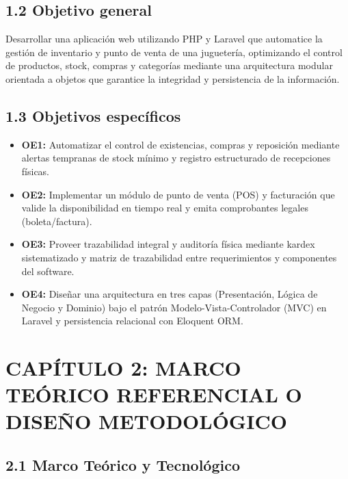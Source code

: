 \documentclass[12pt,a4paper]{article}
\begin{document}
\subsection{1.2 Objetivo general}

Desarrollar una aplicaci\'on web utilizando PHP y Laravel que automatice la
gesti\'on de inventario y punto de venta de una jugueter\'ia, optimizando el control de productos,
stock, compras y categor\'ias mediante una arquitectura modular orientada a objetos que
garantice la integridad y persistencia de la informaci\'on.

\subsection{1.3 Objetivos espec\'ificos}

\begin{itemize}
  \item \textbf{OE1:} Automatizar el control de existencias, compras y reposici\'on mediante alertas tempranas de stock m\'inimo y registro estructurado de recepciones f\'isicas.
  \item \textbf{OE2:} Implementar un m\'odulo de punto de venta (POS) y facturaci\'on que valide la disponibilidad en tiempo real y emita comprobantes legales (boleta/factura).
  \item \textbf{OE3:} Proveer trazabilidad integral y auditor\'ia f\'isica mediante kardex sistematizado y matriz de trazabilidad entre requerimientos y componentes del software.
  \item \textbf{OE4:} Dise\~nar una arquitectura en tres capas (Presentaci\'on, L\'ogica de Negocio y Dominio) bajo el patr\'on Modelo-Vista-Controlador (MVC) en Laravel y persistencia relacional con Eloquent ORM.
\end{itemize}

\clearpage
\section{CAP\'ITULO 2: MARCO TE\'ORICO REFERENCIAL O DISE\~NO METODOL\'OGICO}

\subsection{2.1 Marco Te\'orico y Tecnol\'ogico}
\end{document}
